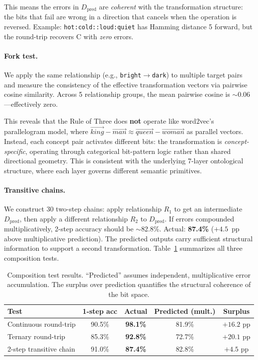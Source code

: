 \documentclass[11pt,a4paper]{article}
\begin{document}
This means the errors in $D_{\text{pred}}$ are \emph{coherent} with the transformation structure: the bits that fail are wrong in a direction that cancels when the operation is reversed. Example: \texttt{hot:cold::loud:quiet} has Hamming distance 5 forward, but the round-trip recovers C with \emph{zero} errors.

\paragraph{Fork test.} We apply the same relationship (e.g., \texttt{bright}$\to$\texttt{dark}) to multiple target pairs and measure the consistency of the effective transformation vectors via pairwise cosine similarity. Across 5 relationship groups, the mean pairwise cosine is $\sim$0.06---effectively zero.

This reveals that the Rule of Three does \textbf{not} operate like word2vec's parallelogram model, where $\vec{king} - \vec{man} \approx \vec{queen} - \vec{woman}$ as parallel vectors. Instead, each concept pair activates different bits: the transformation is \emph{concept-specific}, operating through categorical bit-pattern logic rather than shared directional geometry. This is consistent with the underlying 7-layer ontological structure, where each layer governs different semantic primitives.

\paragraph{Transitive chains.} We construct 30 two-step chains: apply relationship $R_1$ to get an intermediate $D_{\text{pred}}$, then apply a different relationship $R_2$ to $D_{\text{pred}}$. If errors compounded multiplicatively, 2-step accuracy should be $\sim$82.8\%. Actual: \textbf{87.4\%} ($+4.5$~pp above multiplicative prediction). The predicted outputs carry sufficient structural information to support a second transformation. Table~\ref{tab:composition} summarizes all three composition tests.

\begin{table}[h]
\centering
\caption{Composition test results. ``Predicted'' assumes independent, multiplicative error accumulation. The surplus over prediction quantifies the structural coherence of the bit space.}
\label{tab:composition}
\begin{tabular}{lcccc}
\toprule
Test & 1-step acc & Actual & Predicted (mult.) & Surplus \\
\midrule
Continuous round-trip & 90.5\% & \textbf{98.1\%} & 81.9\% & $+16.2$ pp \\
Ternary round-trip    & 85.3\% & \textbf{92.8\%} & 72.7\% & $+20.1$ pp \\
2-step transitive chain & 91.0\% & \textbf{87.4\%} & 82.8\% & $+4.5$ pp \\
\bottomrule
\end{tabular}
\end{table}
\end{document}
